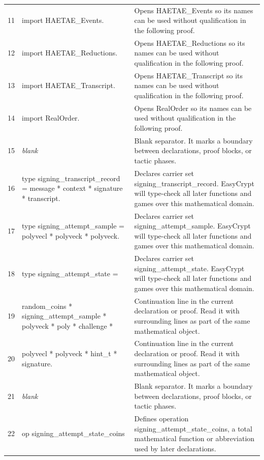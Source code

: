 \documentclass[10pt]{article}
\begin{document}
\begin{longtable}{r L{0.53\textwidth} L{0.37\textwidth}}
11 & {\ttfamily\scriptsize import HAETAE\_Events.} & Opens HAETAE\_Events so its names can be used without qualification in the following proof. \\
12 & {\ttfamily\scriptsize import HAETAE\_Reductions.} & Opens HAETAE\_Reductions so its names can be used without qualification in the following proof. \\
13 & {\ttfamily\scriptsize import HAETAE\_Transcript.} & Opens HAETAE\_Transcript so its names can be used without qualification in the following proof. \\
14 & {\ttfamily\scriptsize import RealOrder.} & Opens RealOrder so its names can be used without qualification in the following proof. \\
15 & {\ttfamily\scriptsize \emph{blank}} & Blank separator.  It marks a boundary between declarations, proof blocks, or tactic phases. \\
16 & {\ttfamily\scriptsize type signing\_transcript\_record = message * context * signature * transcript.} & Declares carrier set signing\_transcript\_record.  EasyCrypt will type-check all later functions and games over this mathematical domain. \\
17 & {\ttfamily\scriptsize type signing\_attempt\_sample = polyvecl * polyveck * polyveck.} & Declares carrier set signing\_attempt\_sample.  EasyCrypt will type-check all later functions and games over this mathematical domain. \\
18 & {\ttfamily\scriptsize type signing\_attempt\_state =} & Declares carrier set signing\_attempt\_state.  EasyCrypt will type-check all later functions and games over this mathematical domain. \\
19 & {\ttfamily\scriptsize   random\_coins * signing\_attempt\_sample * polyveck * poly * challenge *} & Continuation line in the current declaration or proof.  Read it with surrounding lines as part of the same mathematical object. \\
20 & {\ttfamily\scriptsize   polyvecl * polyveck * hint\_t * signature.} & Continuation line in the current declaration or proof.  Read it with surrounding lines as part of the same mathematical object. \\
21 & {\ttfamily\scriptsize \emph{blank}} & Blank separator.  It marks a boundary between declarations, proof blocks, or tactic phases. \\
22 & {\ttfamily\scriptsize op signing\_attempt\_state\_coins} & Defines operation signing\_attempt\_state\_coins, a total mathematical function or abbreviation used by later declarations. \\

\end{longtable}
\end{document}
